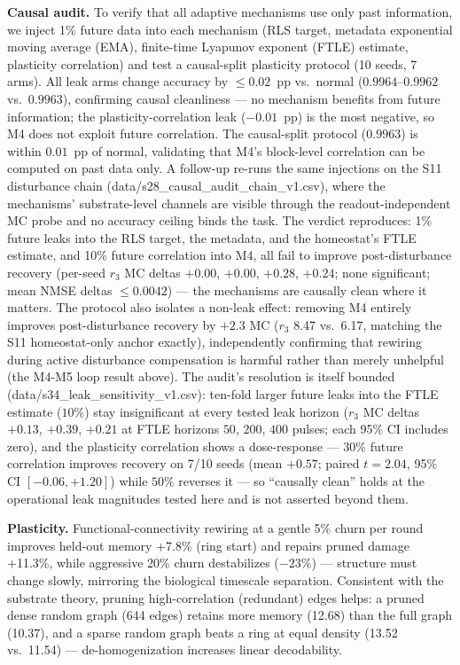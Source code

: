 \documentclass[11pt]{article}
\begin{document}
\textbf{Causal audit.} To verify that all adaptive mechanisms use only past
information, we inject 1\% future data into each mechanism (RLS target,
metadata exponential moving average (EMA), finite-time Lyapunov exponent
(FTLE) estimate, plasticity correlation) and test a causal-split
plasticity protocol (10 seeds, 7 arms). All leak arms change accuracy by
$\le 0.02$~pp vs.\ normal ($0.9964$--$0.9962$ vs.\ $0.9963$), confirming
causal cleanliness --- no mechanism benefits from future information; the
plasticity-correlation leak ($-0.01$~pp) is the most negative, so M4 does not
exploit future correlation. The causal-split protocol ($0.9963$) is within
$0.01$~pp of normal, validating that M4's block-level correlation can be
computed on past data only. A follow-up re-runs the same injections on
the S11 disturbance chain (data/s28\_causal\_audit\_chain\_v1.csv),
where the mechanisms' substrate-level channels are visible through the
readout-independent MC probe and no accuracy ceiling binds the task. The
verdict reproduces: 1\% future leaks into the RLS target, the metadata,
and the homeostat's FTLE estimate, and 10\% future correlation into M4,
all fail to improve post-disturbance recovery (per-seed $r_3$ MC deltas
$+0.00$, $+0.00$, $+0.28$, $+0.24$; none significant; mean NMSE deltas
$\le 0.0042$) --- the mechanisms are causally clean where it matters.
The protocol also isolates a non-leak effect: removing M4 entirely
improves post-disturbance recovery by $+2.3$ MC ($r_3$ 8.47 vs.\ 6.17,
matching the S11 homeostat-only anchor exactly), independently
confirming that rewiring during active disturbance compensation is
harmful rather than merely unhelpful (the M4-M5 loop result above). The
audit's resolution is itself bounded (data/s34\_leak\_sensitivity\_v1.csv):
ten-fold larger future leaks into the FTLE estimate ($10\%$) stay
insignificant at every tested leak horizon ($r_3$ MC deltas $+0.13$,
$+0.39$, $+0.21$ at FTLE horizons $50$, $200$, $400$ pulses; each 95\%
CI includes zero), and the plasticity
correlation shows a dose-response --- $30\%$ future correlation improves
recovery on 7/10 seeds (mean $+0.57$; paired $t{=}2.04$, 95\% CI
$[-0.06,+1.20]$) while $50\%$ reverses it --- so ``causally clean'' holds at the operational
leak magnitudes tested here and is not asserted beyond them.

\textbf{Plasticity.} Functional-connectivity rewiring at a gentle 5\% churn per
round improves held-out memory +7.8\% (ring start) and repairs pruned damage
+11.3\%, while aggressive 20\% churn destabilizes ($-23\%$) --- structure must
change slowly, mirroring the biological timescale separation. Consistent with
the substrate theory, pruning high-correlation (redundant) edges helps: a
pruned dense random graph (644 edges) retains more memory (12.68) than the full
graph (10.37), and a sparse random graph beats a ring at equal density (13.52
vs.\ 11.54) --- de-homogenization increases linear decodability.
\end{document}
